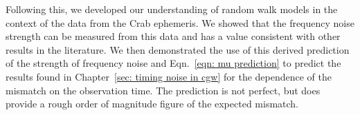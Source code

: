 \documentclass[../full_thesis/full_thesis.tex]{subfiles}
\begin{document}
Following this, we developed our understanding of random walk models in the
context of the data from the Crab ephemeris. We showed that the frequency noise
strength can be measured from this data and has a value consistent with other
results in the literature. We then demonstrated the use of this derived
prediction of the strength of frequency noise and Eqn.~\eqref{eqn: mu
prediction} to predict the results found in Chapter~\ref{sec: timing noise in
cgw} for the dependence of the mismatch on the observation time. The prediction
is not perfect, but does provide a rough order of magnitude figure of the
expected mismatch.

\end{document}
